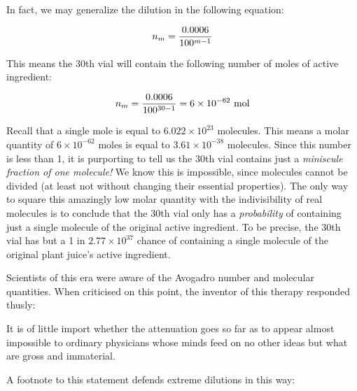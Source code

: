 \vskip 10pt

In fact, we may generalize the dilution in the following equation:

$$n_m = {0.0006 \over 100^{m-1}}$$

This means the 30th vial will contain the following number of moles of active ingredient:

$$n_m = {0.0006 \over 100^{30-1}} = 6 \times 10^{-62} \hbox{ mol}$$

Recall that a single mole is equal to $6.022 \times 10^{23}$ molecules.  This means a molar quantity of $6 \times 10^{-62}$ moles is equal to $3.61 \times 10^{-38}$ molecules.  Since this number is less than 1, it is purporting to tell us the 30th vial contains just a {\it miniscule fraction of one molecule!}  We know this is impossible, since molecules cannot be divided (at least not without changing their essential properties).  The only way to square this amazingly low molar quantity with the indivisibility of real molecules is to conclude that the 30th vial only has a {\it probability} of containing just a single molecule of the original active ingredient.  To be precise, the 30th vial has but a 1 in $2.77 \times 10^{37}$ chance of containing a single molecule of the original plant juice's active ingredient.

Scientists of this era were aware of the Avogadro number and molecular quantities.  When criticised on this point, the inventor of this therapy responded thusly:

\vskip 10pt {\narrower \noindent \baselineskip5pt

It is of little import whether the attenuation goes so far as to appear almost impossible to ordinary physicians whose minds feed on no other ideas but what are gross and immaterial. 

\par} \vskip 10pt

A footnote to this statement defends extreme dilutions in this way:

